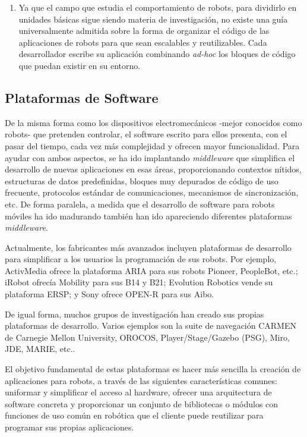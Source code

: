 \begin{enumerate}
	\item Ya que el campo que estudia el comportamiento de robots, para dividirlo en unidades básicas sigue siendo materia de investigación, no existe una guía universalmente admitida sobre la forma de organizar el código de las aplicaciones de robots para que sean escalables y reutilizables. Cada desarrollador escribe su aplicación combinando \textit{ad-hoc} los bloques de código que puedan existir en su entorno.
\end{enumerate}

\subsection{Plataformas de Software}

De la misma forma como los dispositivos electromecánicos -mejor conocidos como robots- que pretenden controlar, el software escrito para ellos presenta, con el pasar del tiempo, cada vez más complejidad y ofrecen mayor funcionalidad. Para ayudar con ambos aspectos, se ha ido implantando \textit{middleware} que simplifica el desarrollo de nuevas aplicaciones en esas áreas, proporcionando contextos nítidos, estructuras de datos predefinidas, bloques muy depurados de código de uso frecuente, protocolos estándar de comunicaciones, mecanismos de sincronización, etc. De forma paralela, a medida que el desarrollo de software para robots móviles ha ido madurando también han ido apareciendo diferentes plataformas \textit{middleware}.

Actualmente, los fabricantes más avanzados incluyen plataformas de desarrollo para simplificar a los usuarios la programación de sus robots. Por ejemplo, ActivMedia ofrece la plataforma ARIA para sus robots Pioneer, PeopleBot, etc.; iRobot ofrecía Mobility para sus B14 y B21; Evolution Robotics vende su plataforma ERSP; y Sony ofrece OPEN-R para sus Aibo.

De igual forma, muchos grupos de investigación han creado sus propias plataformas de desarrollo. Varios ejemplos son la suite de navegación CARMEN de Carnegie Mellon University, OROCOS, Player/Stage/Gazebo (PSG), Miro, JDE, MARIE, etc..

El objetivo fundamental de estas plataformas es hacer más sencilla la creación de aplicaciones para robots, a través de las siguientes características comunes: uniformar y simplificar el acceso al hardware, ofrecer una arquitectura de software concreta y proporcionar un conjunto de bibliotecas o módulos con funciones de uso común en robótica que el cliente puede reutilizar para programar sus propias aplicaciones.

